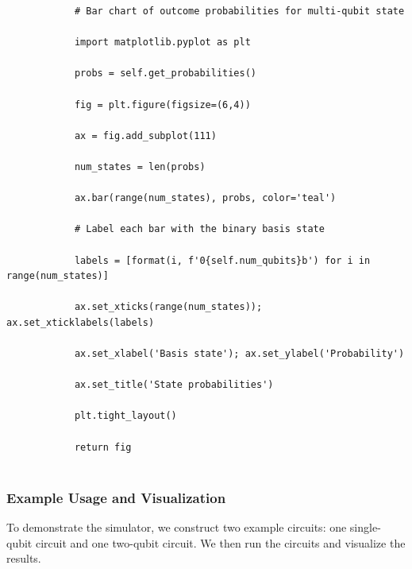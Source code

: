 \documentclass{beamer}
\begin{document}
\begin{frame}
\begin{verbatim}
            # Bar chart of outcome probabilities for multi-qubit state

            import matplotlib.pyplot as plt

            probs = self.get_probabilities()

            fig = plt.figure(figsize=(6,4))

            ax = fig.add_subplot(111)

            num_states = len(probs)

            ax.bar(range(num_states), probs, color='teal')

            # Label each bar with the binary basis state

            labels = [format(i, f'0{self.num_qubits}b') for i in range(num_states)]

            ax.set_xticks(range(num_states)); ax.set_xticklabels(labels)

            ax.set_xlabel('Basis state'); ax.set_ylabel('Probability')

            ax.set_title('State probabilities')

            plt.tight_layout()

            return fig


\end{verbatim}
\end{frame}

\begin{frame}
\frametitle{Example Usage and Visualization}

To demonstrate the simulator, we construct two example circuits: one
single-qubit circuit and one two-qubit circuit. We then run the
circuits and visualize the results.
\end{frame}
\end{document}

